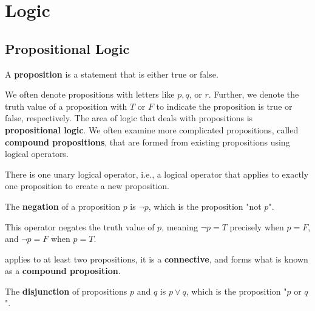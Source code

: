 \chapter{Logic}\label{ch:logic}

    \section{Propositional Logic}\label{sec:proplog}
        \begin{definition}[Proposition]\label{def:prop}
            A \textbf{proposition} is a statement that is either true or false.
        \end{definition}

        We often denote propositions with letters like $p,q$, or $r$. Further, we denote the truth value of a proposition with $T$ or $F$ to indicate the proposition is true or false, respectively. The area of logic that deals with propositions is \textbf{propositional logic}. We often examine more complicated propositions, called \textbf{compound propositions}, that are formed from existing propositions using logical operators.

        There is one unary logical operator, i.e., a logical operator that applies to exactly one proposition to create a new proposition.

        \begin{definition}[Negation]\label{def:neg}
            The \textbf{negation} of a proposition $p$ is $\neg p$, which is the proposition "not $p$".
        \end{definition}

        This operator negates the truth value of $p$, meaning $\neg p = T$ precisely when $p=F$, and $\neg p = F$ when $p=T$.

         applies to at least two propositions, it is a \textbf{connective}, and forms what is known as a \textbf{compound proposition}.
        
        \begin{definition}[Disjunction]\label{def:disj}
            The \textbf{disjunction} of propositions $p$ and $q$ is $p \lor q$, which is the proposition "$p$ or $q$".
        \end{definition}


